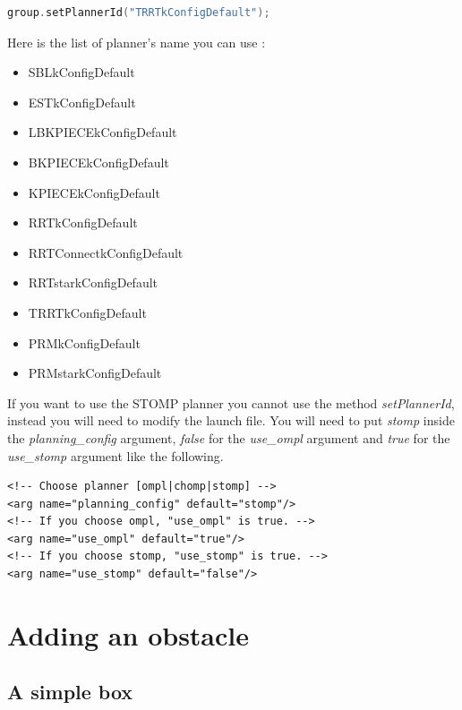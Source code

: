\begin{lstlisting}[language=c++]
group.setPlannerId("TRRTkConfigDefault");
\end{lstlisting}

Here is the list of planner's name you can use :
\begin{itemize}
\item SBLkConfigDefault
\item ESTkConfigDefault
\item LBKPIECEkConfigDefault
\item BKPIECEkConfigDefault
\item KPIECEkConfigDefault
\item RRTkConfigDefault
\item RRTConnectkConfigDefault
\item RRTstarkConfigDefault
\item TRRTkConfigDefault
\item PRMkConfigDefault
\item PRMstarkConfigDefault
\end{itemize}

If you want to use the STOMP planner you cannot use the method \emph{setPlannerId}, instead you will need to modify the launch file. You will need to put \emph{stomp} inside the \emph{planning\_config} argument, \emph{false} for the \emph{use\_ompl} argument and \emph{true} for the \emph{use\_stomp} argument like the following. 



\begin{lstlisting}
<!-- Choose planner [ompl|chomp|stomp] -->
<arg name="planning_config" default="stomp"/>
<!-- If you choose ompl, "use_ompl" is true. -->
<arg name="use_ompl" default="true"/>
<!-- If you choose stomp, "use_stomp" is true. -->
<arg name="use_stomp" default="false"/>
\end{lstlisting}


\section{Adding an obstacle}
\subsection{A simple box}

